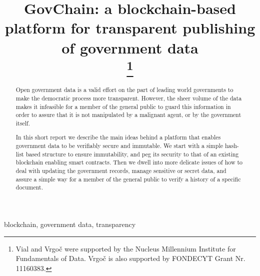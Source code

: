 \documentclass[conference]{IEEEtran}
\begin{document}
\title{GovChain: a blockchain-based platform for transparent publishing of government data\\
\thanks{Vial and Vrgo\v{c} were supported by the Nucleus Millennium Institute for Fundamentals of Data. Vrgo\v{c} is also supported by FONDECYT Grant Nr. 11160383.}
}

\author{
\and
{}
\and
{}
}



\maketitle

\begin{abstract}
Open government data is a valid effort on the part of leading world governments to make the democratic process more transparent. However, the sheer volume of the data makes it infeasible for a member of the general public to guard this information in order to assure that it is not manipulated by a malignant agent, or by the government itself.

In this short report we describe the main ideas behind a platform that enables government data to be verifiably secure and immutable. We start with a simple hash-list based structure to ensure immutability, and peg its security to that of an existing blockchain enabling smart contracts. Then we dwell into more delicate issues of how to deal with updating the government records, manage sensitive or secret data, and assure a simple way for a member of the general public to verify a history of a specific document.
\end{abstract}

\begin{IEEEkeywords}
blockchain, government data, transparency
\end{IEEEkeywords}
\end{document}
